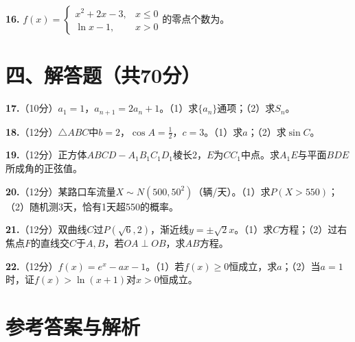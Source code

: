 \documentclass[12pt,a4paper]{ctexart}
\begin{document}
\textbf{16.} $f(x)=\begin{cases}x^2+2x-3,&x\le0\\ \ln x-1,&x>0\end{cases}$的零点个数为\underline{\hspace{2cm}}。

\newpage
\section*{四、解答题（共70分）}

\textbf{17.}（10分）$a_1=1$，$a_{n+1}=2a_n+1$。（1）求$\{a_n\}$通项；（2）求$S_n$。

\vspace{6cm}

\textbf{18.}（12分）$\triangle ABC$中$b=2$，$\cos A=\frac12$，$c=3$。（1）求$a$；（2）求$\sin C$。

\vspace{6cm}

\textbf{19.}（12分）正方体$ABCD-A_1B_1C_1D_1$棱长$2$，$E$为$CC_1$中点。求$A_1E$与平面$BDE$所成角的正弦值。

\vspace{7cm}

\textbf{20.}（12分）某路口车流量$X\sim N(500,50^2)$（辆/天）。（1）求$P(X>550)$；（2）随机测3天，恰有1天超550的概率。

\vspace{6cm}

\textbf{21.}（12分）双曲线$C$过$P(\sqrt6,2)$，渐近线$y=\pm\sqrt2x$。（1）求$C$方程；（2）过右焦点$F$的直线交$C$于$A,B$，若$OA\perp OB$，求$AB$方程。

\vspace{7cm}

\textbf{22.}（12分）$f(x)=e^x-ax-1$。（1）若$f(x)\ge0$恒成立，求$a$；（2）当$a=1$时，证$f(x)>\ln(x+1)$对$x>0$恒成立。

\newpage
\section*{参考答案与解析}
\end{document}
